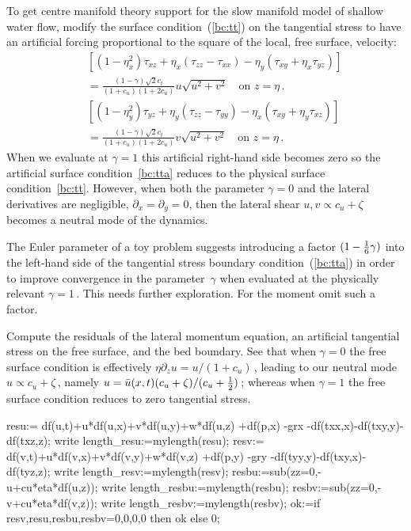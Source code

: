 \documentclass[12pt,a5paper]{article}
\newcommand{\zs}{\zeta}
\newcommand{\uu}{{\bar u}}
\begin{document}
To get centre manifold theory support for the slow manifold model of shallow water flow, modify the surface condition~(\ref{bc:tt}) on the tangential stress to have an artificial forcing proportional to the square of the local, free surface, velocity:
\begin{eqnarray}&&
    \left[
    (1-\eta_x^2)\tau_{xz}+\eta_x(\tau_{zz}-\tau_{xx})
    -\eta_y(\tau_{xy}+\eta_x\tau_{yz})
    \right] 
    \nonumber\\&&{}
    = \frac{(1-\gamma)\sqrt2c_t}{(1+c_u)(1+2c_u)} u\sqrt{u^2+v^2}
    \quad\text{on } z=\eta\,.
    \label{bc:tta}
    \\&&
    \left[
    (1-\eta_y^2)\tau_{yz}+\eta_y(\tau_{zz}-\tau_{yy})
    -\eta_x(\tau_{xy}+\eta_y\tau_{xz})
    \right] 
    \nonumber\\&&{}
    = \frac{(1-\gamma)\sqrt2c_t}{(1+c_u)(1+2c_u)} v\sqrt{u^2+v^2}
    \quad\text{on } z=\eta\,.
    \label{bc:ttay}
\end{eqnarray}
When we evaluate at $\gamma=1$ this artificial right-hand side becomes zero so the artificial surface condition~\eqref{bc:tta} reduces to the physical surface condition~\eqref{bc:tt}.  However, when both the parameter $\gamma=0$ and the lateral derivatives are negligible, $\partial_x=\partial_y=0$, then the lateral shear $u,v\propto c_u+\zs$ becomes a neutral mode of the dynamics.

The Euler parameter of a toy problem suggests introducing a factor $(1-{\textstyle\frac{1}{6}}\gamma)$ into the left-hand side of the tangential stress boundary condition~(\ref{bc:tta}) in order to improve convergence in the parameter~$\gamma$ when evaluated at the physically relevant $\gamma=1$\,.  This needs further exploration.  For the moment omit such a factor.

Compute the residuals of the lateral momentum equation, an artificial tangential stress on the free surface, and the bed boundary.  See that when $\gamma=0$ the free surface condition is effectively $\eta \partial_z u=u/(1+c_u)$\,, leading to our neutral mode $u\propto c_u+\zs$\,, namely $u=\uu(x,t)(c_u+\zs)/(c_u+\rat12)$\,; whereas when $\gamma=1$ the free surface condition reduces to zero tangential stress.

\begin{reduce}
resu:= df(u,t)+u*df(u,x)+v*df(u,y)+w*df(u,z) 
    +df(p,x) -grx -df(txx,x)-df(txy,y)-df(txz,z);
write length_resu:=mylength(resu);
resv:= df(v,t)+u*df(v,x)+v*df(v,y)+w*df(v,z) 
    +df(p,y) -gry -df(tyy,y)-df(txy,x)-df(tyz,z);
write length_resv:=mylength(resv);
resbu:=sub(zz=0,-u+cu*eta*df(u,z));
write length_resbu:=mylength(resbu);  
resbv:=sub(zz=0,-v+cu*eta*df(v,z));
write length_resbv:=mylength(resbv);  
ok:=if {resv,resu,resbu,resbv}={0,0,0,0} then ok else 0;
\end{reduce}
\end{document}
